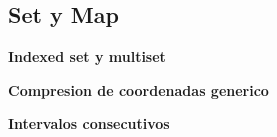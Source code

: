 \subsection{Set y Map}
    \textbf{Indexed set y multiset}
    

    \textbf{Compresion de coordenadas generico}
    

    \textbf{Intervalos consecutivos}
    